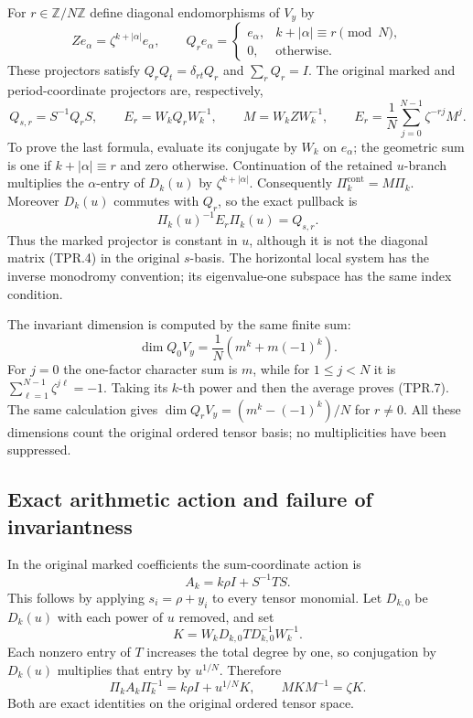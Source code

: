 For \(r\in\mathbb Z/N\mathbb Z\) define diagonal endomorphisms
of \(V_y\) by
\[
 Z e_\alpha=\zeta^{k+|\alpha|}e_\alpha,\qquad
 Q_r e_\alpha=
 \begin{cases}e_\alpha,&k+|\alpha|\equiv r\pmod N,\\
               0,&\text{otherwise}.
 \end{cases}
 \tag{TPR.4}
\]
These projectors satisfy \(Q_rQ_t=\delta_{rt}Q_r\) and
\(\sum_rQ_r=I\). The original marked and period-coordinate
projectors are, respectively,
\[
 Q_{s,r}=S^{-1}Q_rS,\qquad
 E_r=W_kQ_rW_k^{-1},\qquad
 M=W_kZW_k^{-1},\qquad
 E_r=\frac1N\sum_{j=0}^{N-1}\zeta^{-rj}M^j.
 \tag{TPR.5}
\]
To prove the last formula, evaluate its conjugate by \(W_k\)
on \(e_\alpha\); the geometric sum is one if
\(k+|\alpha|\equiv r\) and zero otherwise.
Continuation of the retained \(u\)-branch multiplies the
\(\alpha\)-entry of \(D_k(u)\) by \(\zeta^{k+|\alpha|}\).
Consequently \(\Pi_k^{\mathrm{cont}}=M\Pi_k\).
Moreover \(D_k(u)\) commutes with \(Q_r\), so the exact pullback is
\[
 \Pi_k(u)^{-1}E_r\Pi_k(u)=Q_{s,r}.
 \tag{TPR.6}
\]
Thus the marked projector is constant in \(u\), although it is
not the diagonal matrix (TPR.4) in the original \(s\)-basis.
The horizontal local system has the inverse monodromy convention;
its eigenvalue-one subspace has the same index condition.

The invariant dimension is computed by the same finite sum:
\[
 \dim Q_0V_y
   =\frac1N\left(m^k+m(-1)^k\right).
 \tag{TPR.7}
\]
For \(j=0\) the one-factor character sum is \(m\), while for
\(1\leq j<N\) it is
\(\sum_{\ell=1}^{N-1}\zeta^{j\ell}=-1\).
Taking its \(k\)-th power and then the average proves (TPR.7).
The same calculation gives
\(\dim Q_rV_y=(m^k-(-1)^k)/N\) for \(r\ne0\).
All these dimensions count the original ordered tensor basis;
no multiplicities have been suppressed.

\subsection*{Exact arithmetic action and failure of invariantness}

In the original marked coefficients the sum-coordinate action is
\[
 A_k=k\rho I+S^{-1}TS.
 \tag{TPR.8}
\]
This follows by applying \(s_i=\rho+y_i\) to every tensor monomial.
Let \(D_{k,0}\) be \(D_k(u)\) with each power of \(u\) removed,
and set
\[
 K=W_kD_{k,0}T D_{k,0}^{-1}W_k^{-1}.
 \tag{TPR.9}
\]
Each nonzero entry of \(T\) increases the total degree by one,
so conjugation by \(D_k(u)\) multiplies that entry by
\(u^{1/N}\). Therefore
\[
 \Pi_kA_k\Pi_k^{-1}=k\rho I+u^{1/N}K,\qquad
 M K M^{-1}=\zeta K.
 \tag{TPR.10}
\]
Both are exact identities on the original ordered tensor space.

